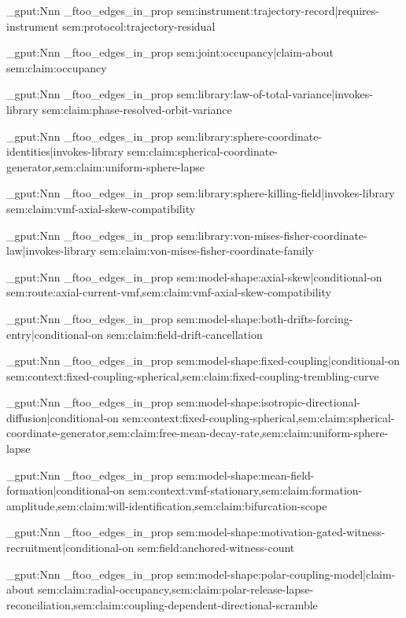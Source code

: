 \prop_gput:Nnn \g_ftoo_edges_in_prop { sem:instrument:trajectory-record|requires-instrument } { sem:protocol:trajectory-residual }

\prop_gput:Nnn \g_ftoo_edges_in_prop { sem:joint:occupancy|claim-about } { sem:claim:occupancy }

\prop_gput:Nnn \g_ftoo_edges_in_prop { sem:library:law-of-total-variance|invokes-library } { sem:claim:phase-resolved-orbit-variance }

\prop_gput:Nnn \g_ftoo_edges_in_prop { sem:library:sphere-coordinate-identities|invokes-library } { sem:claim:spherical-coordinate-generator,sem:claim:uniform-sphere-lapse }

\prop_gput:Nnn \g_ftoo_edges_in_prop { sem:library:sphere-killing-field|invokes-library } { sem:claim:vmf-axial-skew-compatibility }

\prop_gput:Nnn \g_ftoo_edges_in_prop { sem:library:von-mises-fisher-coordinate-law|invokes-library } { sem:claim:von-mises-fisher-coordinate-family }

\prop_gput:Nnn \g_ftoo_edges_in_prop { sem:model-shape:axial-skew|conditional-on } { sem:route:axial-current-vmf,sem:claim:vmf-axial-skew-compatibility }

\prop_gput:Nnn \g_ftoo_edges_in_prop { sem:model-shape:both-drifts-forcing-entry|conditional-on } { sem:claim:field-drift-cancellation }

\prop_gput:Nnn \g_ftoo_edges_in_prop { sem:model-shape:fixed-coupling|conditional-on } { sem:context:fixed-coupling-spherical,sem:claim:fixed-coupling-trembling-curve }

\prop_gput:Nnn \g_ftoo_edges_in_prop { sem:model-shape:isotropic-directional-diffusion|conditional-on } { sem:context:fixed-coupling-spherical,sem:claim:spherical-coordinate-generator,sem:claim:free-mean-decay-rate,sem:claim:uniform-sphere-lapse }

\prop_gput:Nnn \g_ftoo_edges_in_prop { sem:model-shape:mean-field-formation|conditional-on } { sem:context:vmf-stationary,sem:claim:formation-amplitude,sem:claim:will-identification,sem:claim:bifurcation-scope }

\prop_gput:Nnn \g_ftoo_edges_in_prop { sem:model-shape:motivation-gated-witness-recruitment|conditional-on } { sem:field:anchored-witness-count }

\prop_gput:Nnn \g_ftoo_edges_in_prop { sem:model-shape:polar-coupling-model|claim-about } { sem:claim:radial-occupancy,sem:claim:polar-release-lapse-reconciliation,sem:claim:coupling-dependent-directional-scramble }

